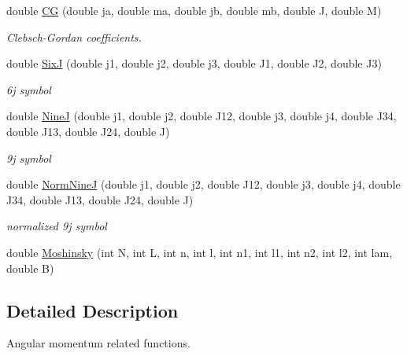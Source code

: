 \begin{DoxyCompactItemize}
\mbox{\label{namespaceAngMom_a3703b9fd8a8f6bd20111ce88aeb3634a}} 
double \hyperlink{namespaceAngMom_a3703b9fd8a8f6bd20111ce88aeb3634a}{CG} (double ja, double ma, double jb, double mb, double J, double M)
\begin{DoxyCompactList}\small\item\em Clebsch-\/\+Gordan coefficients. \end{DoxyCompactList}\item 
\mbox{\label{namespaceAngMom_a6369652f8e2e35a532025b04bcfe94ae}} 
double \hyperlink{namespaceAngMom_a6369652f8e2e35a532025b04bcfe94ae}{SixJ} (double j1, double j2, double j3, double J1, double J2, double J3)
\begin{DoxyCompactList}\small\item\em 6j symbol \end{DoxyCompactList}\item 
\mbox{\label{namespaceAngMom_aabee1d422e1fc4b49d61eccdeb9786cd}} 
double \hyperlink{namespaceAngMom_aabee1d422e1fc4b49d61eccdeb9786cd}{NineJ} (double j1, double j2, double J12, double j3, double j4, double J34, double J13, double J24, double J)
\begin{DoxyCompactList}\small\item\em 9j symbol \end{DoxyCompactList}\item 
\mbox{\label{namespaceAngMom_a651874e08e2cdb65dca72a745df7ef90}} 
double \hyperlink{namespaceAngMom_a651874e08e2cdb65dca72a745df7ef90}{Norm\+NineJ} (double j1, double j2, double J12, double j3, double j4, double J34, double J13, double J24, double J)
\begin{DoxyCompactList}\small\item\em normalized 9j symbol \end{DoxyCompactList}\item 
double \hyperlink{namespaceAngMom_a3817ffc350f81e74b8efe074616b61b8}{Moshinsky} (int N, int L, int n, int l, int n1, int l1, int n2, int l2, int lam, double B)
\end{DoxyCompactItemize}


\subsection{Detailed Description}
Angular momentum related functions. 

